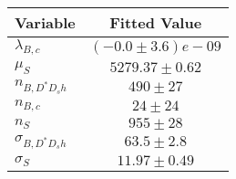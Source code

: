 \begin{tabular}[t]{lc}
\hline
Variable &Fitted Value\\
\hline\hline
$\lambda_{B,c}$&$(-0.0\pm3.6)e-09$\\
\hline
$\mu_S$&$5279.37\pm0.62$\\
\hline
$n_{B, D^* D_s h}$&$490\pm27$\\
\hline
$n_{B,c}$&$24\pm24$\\
\hline
$n_S$&$955\pm28$\\
\hline
$\sigma_{B, D^* D_s h}$&$63.5\pm2.8$\\
\hline
$\sigma_S$&$11.97\pm0.49$\\
\hline
\end{tabular}